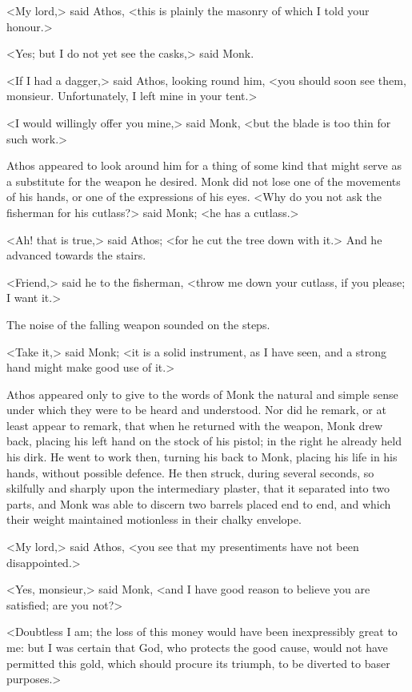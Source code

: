 <My lord,> said Athos, <this is plainly the masonry of which I told your honour.>

<Yes; but I do not yet see the casks,> said Monk.

<If I had a dagger,> said Athos, looking round him, <you should soon see them, monsieur. Unfortunately, I left mine in your tent.>

<I would willingly offer you mine,> said Monk, <but the blade is too thin for such work.>

Athos appeared to look around him for a thing of some kind that might serve as a substitute for the weapon he desired. Monk did not lose one of the movements of his hands, or one of the expressions of his eyes. <Why do you not ask the fisherman for his cutlass?> said Monk; <he has a cutlass.>

<Ah! that is true,> said Athos; <for he cut the tree down with it.> And he advanced towards the stairs.

<Friend,> said he to the fisherman, <throw me down your cutlass, if you please; I want it.>

The noise of the falling weapon sounded on the steps.

<Take it,> said Monk; <it is a solid instrument, as I have seen, and a strong hand might make good use of it.>

Athos appeared only to give to the words of Monk the natural and simple sense under which they were to be heard and understood. Nor did he remark, or at least appear to remark, that when he returned with the weapon, Monk drew back, placing his left hand on the stock of his pistol; in the right he already held his dirk. He went to work then, turning his back to Monk, placing his life in his hands, without possible defence. He then struck, during several seconds, so skilfully and sharply upon the intermediary plaster, that it separated into two parts, and Monk was able to discern two barrels placed end to end, and which their weight maintained motionless in their chalky envelope.

<My lord,> said Athos, <you see that my presentiments have not been disappointed.>

<Yes, monsieur,> said Monk, <and I have good reason to believe you are satisfied; are you not?>

<Doubtless I am; the loss of this money would have been inexpressibly great to me: but I was certain that God, who protects the good cause, would not have permitted this gold, which should procure its triumph, to be diverted to baser purposes.>

